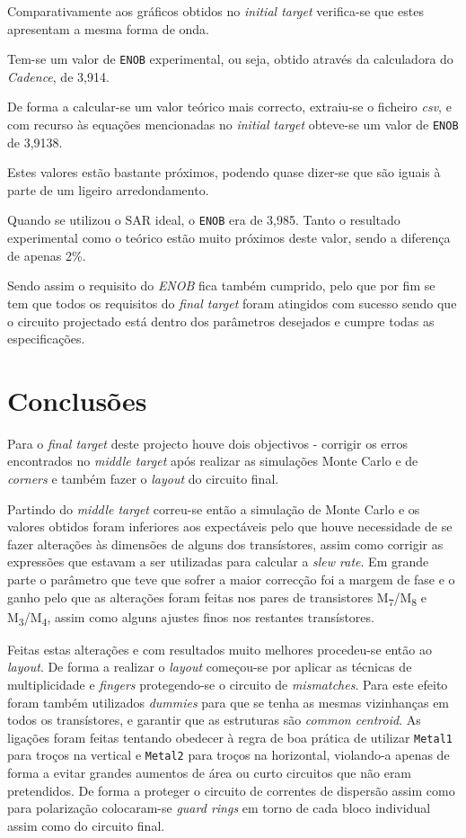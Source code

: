 \documentclass[11pt]{article}
\numberwithin{equation}{section}
\begin{document}
Comparativamente aos gráficos obtidos no \textit{initial target} verifica-se que estes apresentam a mesma forma de onda.

Tem-se um valor de \texttt{ENOB} experimental, ou seja, obtido através da calculadora do \textit{Cadence}, de 3,914.

De forma a calcular-se um valor teórico mais correcto, extraiu-se o ficheiro \textit{csv}, e com recurso às equações mencionadas no \textit{initial target} obteve-se um valor de \texttt{ENOB} de 3,9138.

Estes valores estão bastante próximos, podendo quase dizer-se que são iguais à parte de um ligeiro arredondamento.

Quando se utilizou o SAR ideal, o \texttt{ENOB} era de 3,985. Tanto o resultado experimental como o teórico estão muito próximos deste valor, sendo a diferença de apenas 2\%. 

Sendo assim o requisito do \textit{ENOB} fica também cumprido, pelo que por fim se tem que todos os requisitos do \textit{final target} foram atingidos com sucesso sendo que o circuito projectado está dentro dos parâmetros desejados e cumpre todas as especificações.

\pagebreak

\section{Conclusões}

Para o \textit{final target} deste projecto houve dois objectivos - corrigir os erros encontrados no \textit{middle target} após realizar as simulações Monte Carlo e de \textit{corners} e também fazer o \textit{layout} do circuito final.

Partindo do \textit{middle target} correu-se então a simulação de Monte Carlo e os valores obtidos foram inferiores aos expectáveis pelo que houve necessidade de se fazer alterações às dimensões de alguns dos transístores, assim como corrigir as expressões que estavam a ser utilizadas para calcular a \textit{slew rate}. Em grande parte o parâmetro que teve que sofrer a maior correcção foi a margem de fase e o ganho pelo que as alterações foram feitas nos pares de transistores M\textsubscript{7}/M\textsubscript{8} e M\textsubscript{3}/M\textsubscript{4}, assim como alguns ajustes finos nos restantes transístores.

Feitas estas alterações e com resultados muito melhores procedeu-se então ao \textit{layout}. De forma a realizar o \textit{layout} começou-se por aplicar as técnicas de multiplicidade e \textit{fingers} protegendo-se o circuito de \textit{mismatches}. Para este efeito foram também utilizados \textit{dummies} para que se tenha as mesmas vizinhanças em todos os transístores, e garantir que as estruturas são \textit{common centroid}. As ligações foram feitas tentando obedecer à regra de boa prática de utilizar \texttt{Metal1} para troços na vertical e \texttt{Metal2} para troços na horizontal, violando-a apenas de forma a evitar grandes aumentos de área ou curto circuitos que não eram pretendidos. De forma a proteger o circuito de correntes de dispersão assim como para polarização colocaram-se \textit{guard rings} em torno de cada bloco individual assim como do circuito final.
\end{document}
